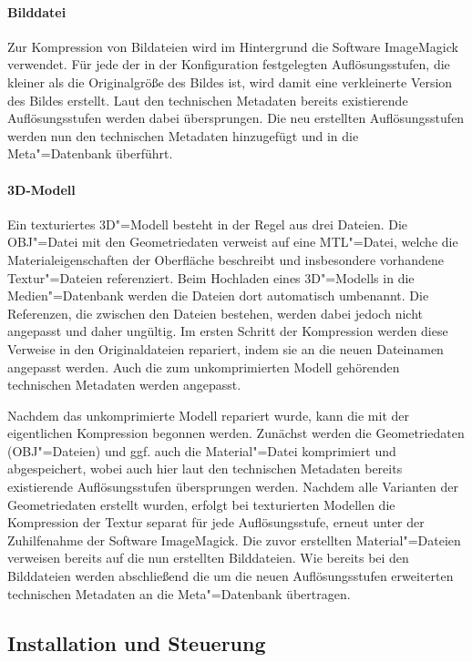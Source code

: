 \paragraph{Bilddatei}

Zur Kompression von Bildateien wird im Hintergrund die Software ImageMagick verwendet. Für jede der in der Konfiguration festgelegten Auflösungsstufen, die kleiner als die Originalgröße des Bildes ist, wird damit eine verkleinerte Version des Bildes erstellt. Laut den technischen Metadaten bereits existierende Auflösungsstufen werden dabei übersprungen. Die neu erstellten Auflösungsstufen werden nun den technischen Metadaten hinzugefügt und in die Meta"=Datenbank überführt.

\paragraph{3D-Modell}

Ein texturiertes 3D"=Modell besteht in der Regel aus drei Dateien. Die OBJ"=Datei mit den Geometriedaten verweist auf eine MTL"=Datei, welche die Materialeigenschaften der Oberfläche beschreibt und insbesondere vorhandene Textur"=Dateien referenziert. Beim Hochladen eines 3D"=Modells in die Medien"=Datenbank werden die Dateien dort automatisch umbenannt. Die Referenzen, die zwischen den Dateien bestehen, werden dabei jedoch nicht angepasst und daher ungültig. Im ersten Schritt der Kompression werden diese Verweise in den Originaldateien repariert, indem sie an die neuen Dateinamen angepasst werden. Auch die zum unkomprimierten Modell gehörenden technischen Metadaten werden angepasst.

Nachdem das unkomprimierte Modell repariert wurde, kann die mit der eigentlichen Kompression begonnen werden. Zunächst werden die Geometriedaten (OBJ"=Dateien) und ggf. auch die Material"=Datei komprimiert und abgespeichert, wobei auch hier laut den technischen Metadaten bereits existierende Auflösungsstufen übersprungen werden. Nachdem alle Varianten der Geometriedaten erstellt wurden, erfolgt bei texturierten Modellen die Kompression der Textur separat für jede Auflösungsstufe, erneut unter der Zuhilfenahme der Software ImageMagick. Die zuvor erstellten Material"=Dateien verweisen bereits auf die nun erstellten Bilddateien. Wie bereits bei den Bilddateien werden abschließend die um die neuen Auflösungsstufen erweiterten technischen Metadaten an die Meta"=Datenbank übertragen.

\subsection{Installation und Steuerung }

